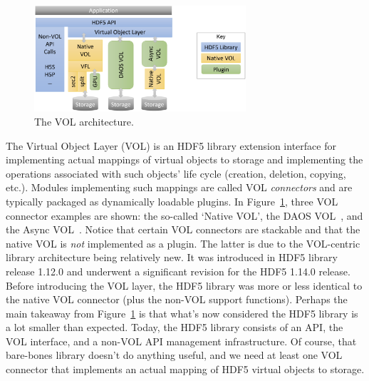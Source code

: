 \begin{figure}[h]
\centering
\includegraphics[width=0.7\textwidth]{images/VOL_arch.png}
\caption{The VOL architecture.}
\label{fig:vol-arch}
\end{figure}

The Virtual Object Layer (VOL) is an HDF5 library extension interface for implementing actual mappings of virtual objects to storage and implementing the operations associated with such objects' life cycle (creation, deletion, copying, etc.). Modules implementing such mappings are called VOL \textit{connectors} and are typically packaged as dynamically loadable plugins. In Figure~\ref{fig:vol-arch}, three VOL connector examples are shown: the so-called `Native VOL', the DAOS VOL~\cite{soumagne2021}, and the Async VOL~\cite{tang2020}. Notice that certain VOL connectors are stackable and that the native VOL is \textit{not} implemented as a plugin. The latter is due to the VOL-centric library architecture being relatively new. It was introduced in HDF5 library release 1.12.0 and underwent a significant revision for the HDF5 1.14.0 release. Before introducing the VOL layer, the HDF5 library was more or less identical to the native VOL connector (plus the non-VOL support functions). Perhaps the main takeaway from Figure~\ref{fig:vol-arch} is that what's now considered the HDF5 library is a lot smaller than expected. Today, the HDF5 library consists of an API, the VOL interface, and a non-VOL API management infrastructure. Of course, that bare-bones library doesn't do anything useful, and we need at least one VOL connector that implements an actual mapping of HDF5 virtual objects to storage.

